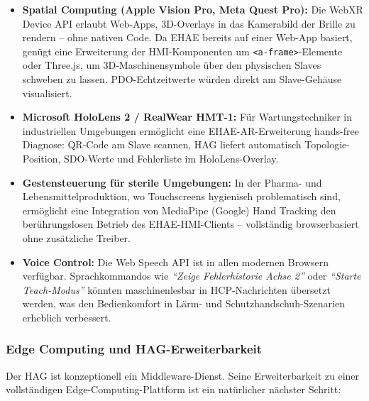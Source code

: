 ﻿\documentclass[12pt,a4paper]{article}
\begin{document}
\begin{itemize}[leftmargin=2em]
  \item \textbf{Spatial Computing (Apple Vision Pro, Meta Quest Pro):}
    Die WebXR Device API erlaubt Web-Apps, 3D-Overlays in das
    Kamerabild der Brille zu rendern -- ohne nativen Code. Da EHAE
    bereits auf einer Web-App basiert, genügt eine Erweiterung der
    HMI-Komponenten um \texttt{<a-frame>}-Elemente oder Three.js, um
    3D-Maschinensymbole über den physischen Slaves schweben zu lassen.
    PDO-Echtzeitwerte würden direkt am Slave-Gehäuse visualisiert.
  \item \textbf{Microsoft HoloLens 2 / RealWear HMT-1:} Für Wartungstechniker
    in industriellen Umgebungen ermöglicht eine EHAE-AR-Erweiterung
    hands-free Diagnose: QR-Code am Slave scannen, HAG liefert
    automatisch Topologie-Position, SDO-Werte und Fehlerliste im
    HoloLens-Overlay.
  \item \textbf{Gestensteuerung für sterile Umgebungen:} In der
    Pharma- und Lebensmittelproduktion, wo Touchscreens hygienisch
    problematisch sind, ermöglicht eine Integration von MediaPipe
    (Google) Hand Tracking den berührungslosen Betrieb des
    EHAE-HMI-Clients -- vollständig browserbasiert ohne
    zusätzliche Treiber.
  \item \textbf{Voice Control:} Die Web Speech API ist in allen
    modernen Browsern verfügbar. Sprachkommandos wie \emph{``Zeige
    Fehlerhistorie Achse 2''} oder \emph{``Starte Teach-Modus''} könnten
    maschinenlesbar in HCP-Nachrichten übersetzt werden,
    was den Bedienkomfort in Lärm- und Schutzhandschuh-Szenarien
    erheblich verbessert.
\end{itemize}

\subsubsection*{Edge Computing und HAG-Erweiterbarkeit}

Der HAG ist konzeptionell ein Middleware-Dienst. Seine Erweiterbarkeit zu einer
vollständigen Edge-Computing-Plattform ist ein natürlicher nächster Schritt:
\end{document}
